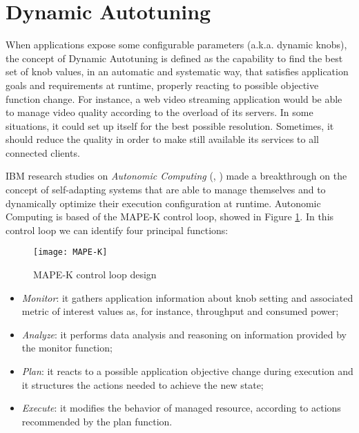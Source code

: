 \section{Dynamic Autotuning}

When applications expose some configurable parameters (a.k.a. dynamic knobs), the concept of Dynamic Autotuning is defined as the capability to find the best set of knob values, in an automatic and systematic way, that satisfies application goals and requirements at runtime, properly reacting to possible objective function change. For instance, a web video streaming application would be able to manage video quality according to the overload of its servers. In some situations, it could set up itself for the best possible resolution. Sometimes, it should reduce the quality in order to make still available its services to all connected clients.

IBM research studies on \textit{Autonomic Computing} (\cite{kephart2003vision}, \cite{computing2006architectural}) made a breakthrough on the concept of self-adapting systems that are able to manage themselves and to dynamically optimize their execution configuration at runtime. Autonomic Computing is based of the MAPE-K control loop, showed in Figure \ref{fig::mape-k}. In this control loop we can identify four principal functions:

\begin{figure}[htb]

    \centering
    \texttt{[image: MAPE-K]}
    \caption{MAPE-K control loop design}
    \label{fig::mape-k}

\end{figure}

\begin{itemize}

    \item \textit{Monitor}: it gathers application information about knob setting and associated metric of interest values as, for instance, throughput and consumed power;
    
    \item \textit{Analyze}: it performs data analysis and reasoning on information provided by the monitor function;
    
    \item \textit{Plan}: it reacts to a possible application objective change during execution and it structures the actions needed to achieve the new state;
    
    \item \textit{Execute}: it modifies the behavior of managed resource, according to actions recommended by the plan function.

\end{itemize}

